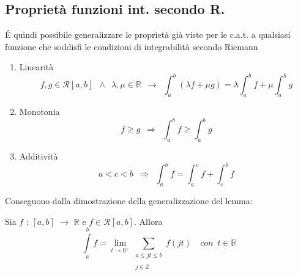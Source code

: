 \documentclass[10pt, oneside]{book}
\theoremstyle{plain}
\begin{document}
\subsection{Proprietà funzioni int. secondo R.}
\'E quindi possibile generalizzare le proprietà già viste per le c.a.t. a qualsiasi funzione che soddisfi le condizioni di integrabilità secondo Riemann
\begin{enumerate}
    \item Linearità
    \[f,g \in \mathcal{R}[a,b] \enspace \land \enspace \lambda, \mu \in \mathbb{R} \enspace \rightarrow \enspace \int_a^b (\lambda f + \mu g) = \lambda \int_a^b f + \mu \int_a^b g\]
    \item Monotonia
    \[f \geq g \enspace \Rightarrow \enspace \int_a^b f \geq \int_a^b g\]
    \item Additività
    \[a < c < b \enspace \Rightarrow \enspace \int_a^b f = \int_a^c f + \int_c^b f\]
\end{enumerate}
Conseguono dalla dimostrazione della generalizzazione del lemma:
\begin{lem}
    Sia $f$ : $[a,b]$ $\rightarrow$ $\mathbb{R}$ e $f \in \mathcal{R}[a,b]$. Allora
    \[\int\limits_{a}^{b} f = \lim\limits_{t \rightarrow 0^+}^{} \sum_{\substack{a \leq jt \leq b \\~\\ j \in \mathbb{Z}}} f(jt) \quad con \enspace t \in \mathbb{R}\]
\end{lem}
\end{document}
